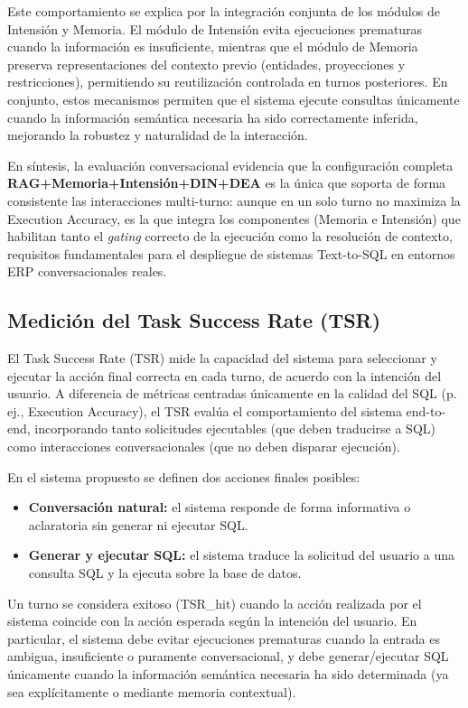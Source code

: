 \documentclass[journal]{IEEEtran}
\begin{document}
Este comportamiento se explica por la integración conjunta de los módulos de Intensión y Memoria. El módulo de Intensión evita ejecuciones prematuras cuando la información es insuficiente, mientras que el módulo de Memoria preserva representaciones del contexto previo (entidades, proyecciones y restricciones), permitiendo su reutilización controlada en turnos posteriores. En conjunto, estos mecanismos permiten que el sistema ejecute consultas únicamente cuando la información semántica necesaria ha sido correctamente inferida, mejorando la robustez y naturalidad de la interacción.

En síntesis, la evaluación conversacional evidencia que la configuración completa \textbf{RAG+Memoria+Intensión+DIN+DEA} es la única que soporta de forma consistente las interacciones multi-turno: aunque en un solo turno no maximiza la Execution Accuracy, es la que integra los componentes (Memoria e Intensión) que habilitan tanto el \emph{gating} correcto de la ejecución como la resolución de contexto, requisitos fundamentales para el despliegue de sistemas Text-to-SQL en entornos ERP conversacionales reales.

\subsection{Medición del Task Success Rate (TSR)}

El Task Success Rate (TSR) mide la capacidad del sistema para seleccionar y ejecutar la acción final correcta en cada turno, de acuerdo con la intención del usuario. A diferencia de métricas centradas únicamente en la calidad del SQL (p. ej., Execution Accuracy), el TSR evalúa el comportamiento del sistema end-to-end, incorporando tanto solicitudes ejecutables (que deben traducirse a SQL) como interacciones conversacionales (que no deben disparar ejecución).

En el sistema propuesto se definen dos acciones finales posibles:

\begin{itemize}
	\item \textbf{Conversación natural:} el sistema responde de forma informativa o aclaratoria sin generar ni ejecutar SQL.
	\item \textbf{Generar y ejecutar SQL:} el sistema traduce la solicitud del usuario a una consulta SQL y la ejecuta sobre la base de datos.
\end{itemize}

Un turno se considera exitoso (TSR\_hit) cuando la acción realizada por el sistema coincide con la acción esperada según la intención del usuario. En particular, el sistema debe evitar ejecuciones prematuras cuando la entrada es ambigua, insuficiente o puramente conversacional, y debe generar/ejecutar SQL únicamente cuando la información semántica necesaria ha sido determinada (ya sea explícitamente o mediante memoria contextual).
\end{document}
